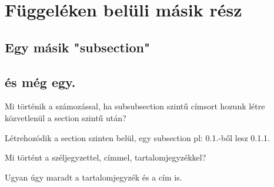 \documentclass[twocolumn]{book}
\begin{document}
\section{Függeléken belüli másik rész}
\subsection{Egy másik "subsection"}
\subsection{és még egy.}


\newpage

{
Mi történik a számozással, ha subsubsection szintű címsort hozunk létre
közvetlenül a section szintű után? \par
Létrehozódik a section szinten belül, egy subsection pl: 0.1.-ből lesz 0.1.1.

Mi történt a széljegyzettel, címmel, tartalomjegyzékkel? \par
Ugyan úgy maradt a tartalomjegyzék és a cím is.
}
\end{document}
